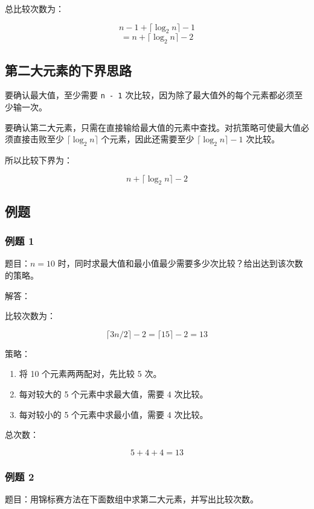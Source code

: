 \documentclass[UTF8,zihao=-4]{ctexart}
\begin{document}
总比较次数为：

\[n - 1 + \lceil \log_2 n \rceil - 1\]
\[= n + \lceil \log_2 n \rceil - 2\]

\subsection*{第二大元素的下界思路}

要确认最大值，至少需要 \texttt{n - 1} 次比较，因为除了最大值外的每个元素都必须至少输一次。

要确认第二大元素，只需在直接输给最大值的元素中查找。对抗策略可使最大值必须直接击败至少 $\lceil \log_2 n \rceil$ 个元素，因此还需要至少 $\lceil \log_2 n \rceil - 1$ 次比较。

所以比较下界为：

\[n + \lceil \log_2 n \rceil - 2\]

\subsection*{例题}

\subsubsection*{例题 1}

题目：$n = 10$ 时，同时求最大值和最小值最少需要多少次比较？给出达到该次数的策略。

解答：

比较次数为：

\[\lceil 3n/2 \rceil - 2 = \lceil 15 \rceil - 2 = 13\]

策略：

\begin{enumerate}
\item 将 10 个元素两两配对，先比较 5 次。
\item 每对较大的 5 个元素中求最大值，需要 4 次比较。
\item 每对较小的 5 个元素中求最小值，需要 4 次比较。
\end{enumerate}

总次数：

\[5 + 4 + 4 = 13\]

\subsubsection*{例题 2}

题目：用锦标赛方法在下面数组中求第二大元素，并写出比较次数。
\end{document}
